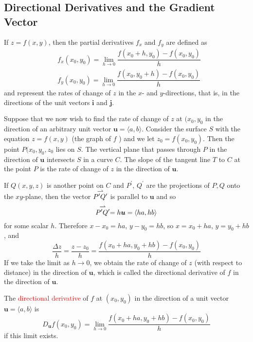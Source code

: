 \documentclass[12pt,a4paper]{article}
\newcommand{\myvec}[1]%
   {\stackrel{\raisebox{-2pt}[0pt][0pt]{\small$\rightharpoonup$}}{#1}}  %
\renewcommand{\vec}[1]{\boldsymbol{#1}}
\begin{document}
\subsection{Directional Derivatives and the Gradient Vector}
\cite{stewart2015calculus}  If $z = f(x, y)$, then the partial derivatives $f_x$ and $f_y$ are defined as
\begin{align}
& f_x(x_0, y_0) = \underset{h \rightarrow 0}\lim \dfrac{f(x_0 +h, y_0) -f(x_0, y_0)}{h} \\
& f_y(x_0, y_0) = \underset{h \rightarrow 0}\lim \dfrac{f(x_0, y_0+h) -f(x_0, y_0)}{h} 
\end{align}
and represent the rates of change of $z$ in the $x$- and $y$-directions, that is, in the directions of the unit vectors $\vec{i}$ and $\vec{j}$.

Suppose that we now wish to find the rate of change of $z$ at $(x_0, y_0$ in the direction of an arbitrary unit vector $\vec{u} = \langle a, b\rangle$. Consider the surface $S$ with the equation $z = f(x, y)$ (the graph of $f$ ) and we let $z_0 = f(x_0, y_0)$. Then the point $P(x_0, y_0, z_0$ lies on $S$. The vertical plane that passes through $P$ in the direction of $\vec{u}$ intersects $S$ in a curve $C$. The slope of the tangent line $T$ to $C$ at the point $P$ is the rate of change of $z$ in the direction of $\vec{u}$.

If $Q(x, y, z)$ is another point on $C$ and $P^\prime$, $Q^\prime$ are the projections of $P, Q$ onto the $xy$-plane, then the vector $\myvec{P^{\prime}Q^{\prime}}$ is parallel to $\vec{u}$ and so
\begin{equation*}
\myvec{P^{\prime}Q^{\prime}} = h\vec{u} = \langle ha, hb\rangle
\end{equation*}
for some scalar $h$. Therefore $x-x_0 = ha$, $y-y_0 = hb$, so $x = x_0 +ha$, $y =y_0 +hb$, and 
\begin{equation*}
\dfrac{\Delta z}{h} = \dfrac{z -z_0}{h} = \dfrac{f(x_0 +h a, y_0 +h b) -f(x_0, y_0)}{h}
\end{equation*}
If we take the limit as $h \rightarrow 0$, we obtain the rate of change of $z$ (with respect to distance) in the direction of $\vec{u}$, which is called the directional derivative of $f$ in the direction of $\vec{u}$.


\begin{tcolorbox}[colback=green!5,colframe=green!40!black,title= Definition]
The \textcolor{red}{directional derivative} of $f$ at $(x_0, y_0)$ in the direction of a unit vector $\vec{u} = \langle a, b\rangle$ is
\begin{equation*}
D_{\vec{u}} f(x_0, y_0) = \underset{h \rightarrow 0}\lim \dfrac{f(x_0 +h a, y_0 +h b) -f(x_0, y_0)}{h}
\end{equation*}
if this limit exists.
\end{tcolorbox}
\end{document}
